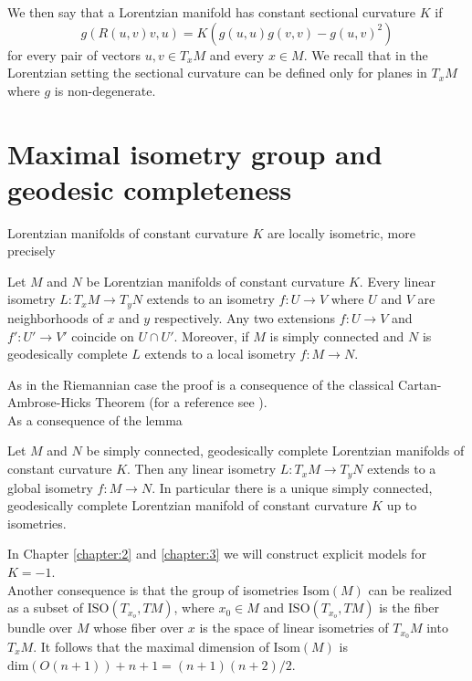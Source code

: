\noindent We then say that a Lorentzian manifold has constant sectional curvature $K$ if
\begin{equation}\label{sectionalcurvature}
    g(R(u,v)v,u)=K(g(u,u)g(v,v)-g(u,v)^2) 
\end{equation}
for every pair of vectors $u,v \in T_{x}M$ and every $x\in M$. We recall that in the Lorentzian setting the sectional curvature can be defined only for planes in $T_{x}M$ where $g$ is non-degenerate.\\

\section{Maximal isometry group and geodesic completeness}
Lorentzian manifolds of constant curvature $K$ are locally isometric, more precisely
\begin{lemma}
    Let $M$ and $N$ be Lorentzian manifolds of constant curvature $K$. Every linear isometry $L: T_x M \to T_y N$ extends to an isometry $f: U \to V$ where $U$ and $V$ are neighborhoods of $x$ and $y$ respectively. Any two extensions $f:U\to V$ and $f' : U' \to V'$ coincide on $U \cap U'$. Moreover, if $M$ is simply connected and $N$ is geodesically complete $L$ extends to a local isometry $f:M\to N$.
\end{lemma}
As in the Riemannian case the proof is a consequence of the classical Cartan-Ambrose-Hicks Theorem (for a reference see \cite{piccione2005single}).\\
As a consequence of the lemma
\begin{corollary}
    Let $M$ and $N$ be simply connected, geodesically complete Lorentzian manifolds of constant curvature $K$. Then any linear isometry $L: T_x M \to T_y N$ extends to a global isometry $f: M \to N$. In particular there is a unique simply connected, geodesically complete Lorentzian manifold of constant curvature $K$ up to isometries.
\end{corollary}
\noindent In Chapter \ref{chapter:2} and \ref{chapter:3} we will construct explicit models for $K=-1$.\\
Another consequence is that the group of isometries $\text{Isom}(M)$ can be realized as a subset of $\text{ISO}(T_{x_o}, TM)$, where $x_0 \in M$ and $\text{ISO}(T_{x_o}, TM)$ is the fiber bundle over $M$ whose fiber over $x$ is the space of linear isometries of $T_{x_0}M$ into $T_xM$.
It follows that the maximal dimension of $\text{Isom}(M)$ is $\text{dim}(O(n+1)) + n +1 = (n+1)(n+2)/2$.\\
